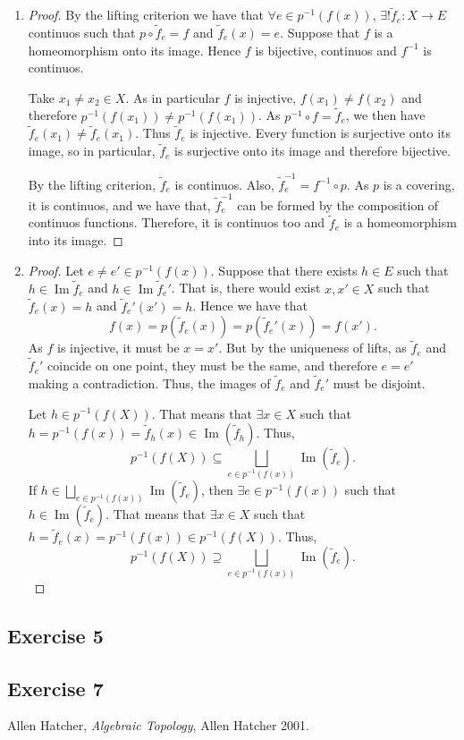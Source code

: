 \documentclass[11pt,a4paper]{article}
\newcommand{\im}{\operatorname{Im}}
\begin{document}
  \begin{enumerate}[label=\alph*)]
    \item \begin{proof} By the lifting criterion we have that $ \forall e \in p^{-1}(f(x)) $, $ \exists ! \tilde f_e \colon X \to E $ continuos such that $ p \circ \tilde f_e = f $ and $ \tilde f_e(x) = e $. Suppose that $ f $ is a homeomorphism onto its image. Hence $ f $ is bijective, continuos and $ f^{-1} $ is continuos.
    
    Take $ x_1 \neq x_2 \in X $. As in particular $ f $ is injective, $ f(x_1) \neq f(x_2) $ and therefore $ p^{-1}(f(x_1)) \neq p^{-1}(f(x_1)) $. As $ p^{-1} \circ f = \tilde f_e $, we then have $ \tilde f_e(x_1) \neq \tilde f_e(x_1) $. Thus $ \tilde f_e $ is injective. Every function is surjective onto its image, so in particular, $ \tilde f_e $ is surjective onto its image and therefore bijective.
  
    By the lifting criterion, $ \tilde f_e $ is continuos. Also, $ \tilde f_e^{-1} = f^{-1} \circ p $. As $ p $ is a covering, it is continuos, and we have that, $ \tilde f_e^{-1} $ can be formed by the composition of continuos functions. Therefore, it is continuos too and $ \tilde f_e $ is a homeomorphism into its image.
    \end{proof}
  
    \item \begin{proof} Let $ e \neq e' \in p^{-1}(f(x)) $. Suppose that there exists $ h \in E $ such that $ h \in \im \tilde f_e $ and $ h \in \im \tilde f_e' $. That is, there would exist $ x, x' \in X $ such that $ \tilde f_e(x) = h $ and $ \tilde f_e'(x') = h $. Hence we have that
    $$
      f(x) = p(\tilde f_e(x)) = p(\tilde f_e'(x)) = f(x').
    $$
    As $ f $ is injective, it must be $ x = x' $. But by the uniqueness of lifts, as $ \tilde f_e $ and  $ \tilde f_e' $ coincide on one point, they must be the same, and therefore $ e = e' $ making a contradiction. Thus, the images of $ \tilde f_e $ and $ \tilde f_e' $ must be disjoint.

    Let $ h \in p^{-1} (f(X)) $. That means that $ \exists x \in X $ such that $ h = p^{-1}(f(x)) = \tilde f_h(x) \in \im(\tilde f_h)$. Thus,
    $$
      p^{-1} (f(X)) \subseteq \bigsqcup_{e \in p^{-1} (f(x))} \im(\tilde f_e).
    $$
    If $ h \in \bigsqcup_{e \in p^{-1} (f(x))} \im(\tilde f_e) $, then $ \exists e \in p^{-1} (f(x)) $ such that $ h \in \im(\tilde f_e) $. That means that $ \exists x \in X $ such that $ h = \tilde f_e(x) = p^{-1}(f(x)) \in p^{-1}(f(X)) $. Thus,
    $$
      p^{-1} (f(X)) \supseteq \bigsqcup_{e \in p^{-1} (f(x))} \im(\tilde f_e).
    $$
    \end{proof}
  \end{enumerate}


\subsection*{Exercise 5}

\subsection*{Exercise 7}

\begin{thebibliography}{9}

  Allen Hatcher,
  \textit{Algebraic Topology},
  Allen Hatcher 2001.

\end{thebibliography}
\end{document}

